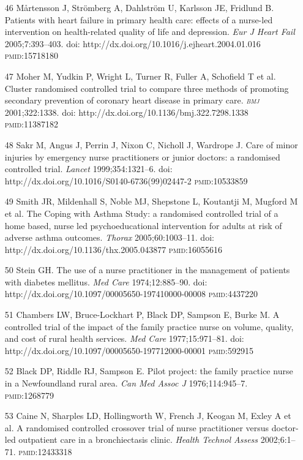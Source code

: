 \documentclass{article}
\begin{document}
\begin{itemize}
\item[46] Mårtensson J, Strömberg A, Dahlström U, Karlsson JE, Fridlund
B. Patients with heart failure in primary health care: effects of a nurse-led
intervention on
health-related quality of life and depression. \textit{Eur J Heart Fail}
2005;7:393–403.
doi: http://dx.doi.org/10.1016/j.ejheart.2004.01.016 \textsc{pmid}:15718180

\item[47] Moher M, Yudkin P, Wright L, Turner R, Fuller A, Schofield T et al.
Cluster
randomised controlled trial to compare three methods of promoting secondary
prevention of coronary
heart disease in primary care. \textit{\textsc{bmj}}
2001;322:1338. doi:
http://dx.doi.org/10.1136/bmj.322.7298.1338 \textsc{pmid}:11387182

\item[48] Sakr M, Angus J, Perrin J, Nixon C, Nicholl J, Wardrope J. Care of
minor injuries by
emergency nurse practitioners or junior doctors: a randomised controlled trial.
\textit{Lancet}
1999;354:1321–6. doi: http://dx.doi.org/10.1016/S0140-6736(99)02447-2
\textsc{pmid}:10533859

\item[49] Smith JR, Mildenhall S, Noble MJ, Shepstone L, Koutantji M, Mugford M
et al. The
Coping with Asthma Study: a randomised controlled trial of a home based, nurse
led psychoeducational
intervention for adults at risk of adverse asthma outcomes. \textit{Thorax}
2005;60:1003–11.
doi: http://dx.doi.org/10.1136/thx.2005.043877 \textsc{pmid}:16055616

\item[50] Stein GH. The use of a nurse practitioner in the management of
patients with
diabetes mellitus. \textit{Med Care}
1974;12:885–90. doi:
http://dx.doi.org/10.1097/00005650-197410000-00008 \textsc{pmid}:4437220

\item[51] Chambers LW, Bruce-Lockhart P, Black DP, Sampson E, Burke M. A
controlled trial of
the impact of the family practice nurse on volume, quality, and cost of rural
health services.
\textit{Med Care}
1977;15:971–81. doi: http://dx.doi.org/10.1097/00005650-197712000-00001
\textsc{pmid}:592915

\item[52] Black DP, Riddle RJ, Sampson E. Pilot project: the family practice
nurse in a
Newfoundland rural area. \textit{Can Med Assoc J}
1976;114:945–7.
\textsc{pmid}:1268779

\item[53] Caine N, Sharples LD, Hollingworth W, French J, Keogan M, Exley A et
al. A
randomised controlled crossover trial of nurse practitioner versus doctor-led
outpatient care in a
bronchiectasis clinic. \textit{Health Technol Assess}
2002;6:1–71.
\textsc{pmid}:12433318


\end{itemize}
\end{document}

